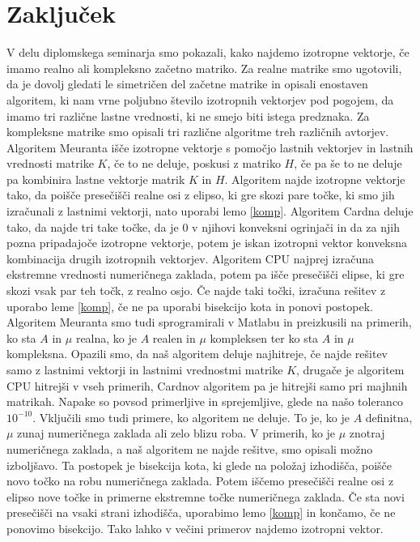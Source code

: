 \documentclass[12pt,a4paper]{amsart}
\theoremstyle{definition}
\theoremstyle{plain}
\begin{document}
\section{Zaključek}
V delu diplomskega seminarja smo pokazali, kako najdemo izotropne vektorje, če imamo realno ali kompleksno začetno matriko. 
Za realne matrike smo ugotovili, da je dovolj gledati le simetričen del začetne matrike in opisali enostaven algoritem, ki nam vrne poljubno število izotropnih vektorjev pod pogojem, da imamo tri različne lastne vrednosti, ki ne smejo biti istega predznaka. 
Za kompleksne matrike smo opisali tri različne algoritme treh različnih avtorjev. 
Algoritem Meuranta išče izotropne vektorje s pomočjo lastnih vektorjev in lastnih vrednosti matrike $K$, če to ne deluje, poskusi z matriko $H$, če pa še to ne deluje pa kombinira lastne vektorje matrik $K$ in $H$. 
Algoritem najde izotropne vektorje tako, da poišče presečišči realne osi z elipso, ki gre skozi pare točke, ki smo jih izračunali z lastnimi vektorji, nato uporabi lemo \ref{komp}. 
Algoritem Cardna deluje tako, da najde tri take točke, da je 0 v njihovi konveksni ogrinjači in da za njih pozna pripadajoče izotropne vektorje, potem je iskan izotropni vektor konveksna kombinacija drugih izotropnih vektorjev. 
Algoritem CPU najprej izračuna ekstremne vrednosti numeričnega zaklada, potem pa išče presečišči elipse, ki gre skozi vsak par teh točk, z realno osjo. 
Če najde taki točki, izračuna rešitev z uporabo leme \ref{komp}, če ne pa uporabi bisekcijo kota in ponovi postopek. 
Algoritem Meuranta smo tudi sprogramirali v Matlabu in preizkusili na primerih, ko sta $A$ in $\mu$ realna, ko je $A$ realen in $\mu$ kompleksen ter ko sta $A$ in $\mu$ kompleksna. 
Opazili smo, da naš algoritem deluje najhitreje, če najde rešitev samo z lastnimi vektorji in lastnimi vrednostmi matrike $K$, drugače je algoritem CPU hitrejši v vseh primerih, Cardnov algoritem pa je hitrejši samo pri majhnih matrikah. 
Napake so povsod primerljive in sprejemljive, glede na našo toleranco $10^{-10}$. 
Vključili smo tudi primere, ko algoritem ne deluje. 
To je, ko je $A$ definitna, $\mu$ zunaj numeričnega zaklada ali zelo blizu roba. 
V primerih, ko je $\mu$ znotraj numeričnega zaklada, a naš algoritem ne najde rešitve, smo opisali možno izboljšavo. 
Ta postopek je bisekcija kota, ki glede na položaj izhodišča, poišče novo  točko na robu numeričnega zaklada. 
Potem iščemo presečišči realne osi z elipso nove točke in primerne ekstremne točke numeričnega zaklada. 
Če sta novi presečišči na vsaki strani izhodišča, uporabimo lemo \ref{komp} in končamo, če ne ponovimo bisekcijo. 
Tako lahko v večini primerov  najdemo izotropni vektor.
\end{document}
